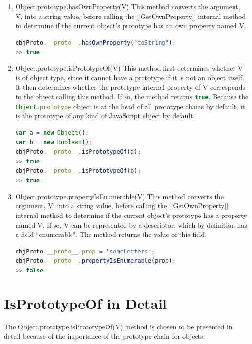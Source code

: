 \documentclass[a4paper,11pt,twoside]{report}
\def\jsinline{\lstinline[language=JavaScript, basicstyle=\small]}%\end{lstlisting}
\begin{document}
\begin{enumerate}
\item Object.prototype.hasOwnProperty(V) \newline
This method converts the argument, V, into a string value, before calling the [[GetOwnProperty]] internal method to determine if the current object's prototype has an own property named V.

\jsinline|objProto.__proto__.hasOwnProperty("toString");|\\
\jsinline|>> true|

\item Object.prototype.isPrototypeOf(V) \newline
This method first determines whether V is of object type, since it cannot have a prototype if it is not an object itself. It then determines whether the prototype internal property of V corresponds to the object calling this method. If so, the method returns \jsinline|true|. Because the \jsinline|Object.prototype| object is at the head of all prototype chains by default, it is the prototype of any kind of JavaScript object by default.

\jsinline|var a = new Object();| \\
\jsinline|var b = new Boolean();| \\
\jsinline|objProto.__proto__.isPrototypeOf(a);| \\
\jsinline|>> true| \\
\jsinline|objProto.__proto__.isPrototypeOf(b);| \\
\jsinline|>> true|

\item Object.prototype.propertyIsEnumerable(V) \newline
This method converts the argument, V, into a string value, before calling the [[GetOwnProperty]] internal method to determine if the current object's prototype has a property named V. If so, V can be represented by a descriptor, which by definition has a field ``enumerable". The method returns the value of this field.

\jsinline|objProto.__proto__.prop = "someLetters";| \\
\jsinline|objProto.__proto__.propertyIsEnumerable(prop);| \\
\jsinline|>> false|

\end{enumerate}

\section{IsPrototypeOf in Detail}
The Object.prototype.isPrototypeOf(V) method is chosen to be presented in detail because of the importance of the prototype chain for objects. 
\end{document}
